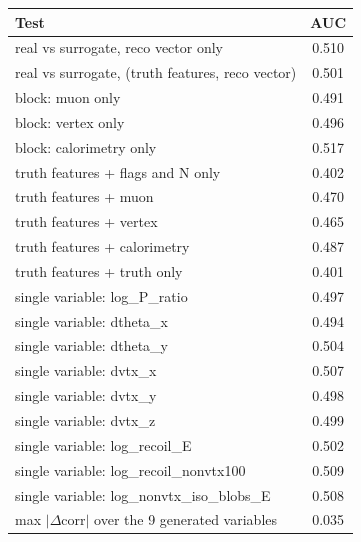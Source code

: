 \begin{tabular}{lc}
\toprule
Test & AUC \\
\midrule
real vs surrogate, reco vector only & 0.510 \\
real vs surrogate, (truth features, reco vector) & 0.501 \\
\midrule
block: muon only & 0.491 \\
block: vertex only & 0.496 \\
block: calorimetry only & 0.517 \\
truth features + flags and N only & 0.402 \\
truth features + muon & 0.470 \\
truth features + vertex & 0.465 \\
truth features + calorimetry & 0.487 \\
truth features + truth only & 0.401 \\
single variable: log\_P\_ratio & 0.497 \\
single variable: dtheta\_x & 0.494 \\
single variable: dtheta\_y & 0.504 \\
single variable: dvtx\_x & 0.507 \\
single variable: dvtx\_y & 0.498 \\
single variable: dvtx\_z & 0.499 \\
single variable: log\_recoil\_E & 0.502 \\
single variable: log\_recoil\_nonvtx100 & 0.509 \\
single variable: log\_nonvtx\_iso\_blobs\_E & 0.508 \\
\midrule
max $|\Delta$corr$|$ over the 9 generated variables & 0.035 \\
\bottomrule
\end{tabular}
